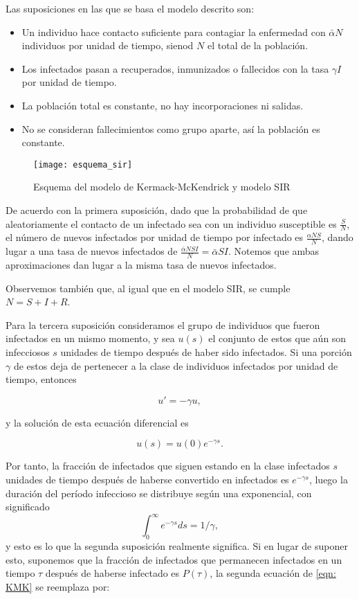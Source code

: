 Las suposiciones en las que se basa el modelo descrito son:

\begin{itemize}
\item Un individuo hace contacto suficiente para contagiar la enfermedad con $\bar{\alpha} N$ individuos por unidad de tiempo, sienod $N$ el total de la población.
\item Los infectados pasan a recuperados, inmunizados o fallecidos con la tasa $\gamma I$ por unidad de tiempo.
\item La población total es constante, no hay incorporaciones ni salidas.
\item No se consideran fallecimientos como grupo aparte, así la población es constante.
\end{itemize}

\begin{figure}
\begin{center}
\caption{Esquema del modelo de Kermack-McKendrick y modelo SIR}
\texttt{[image: esquema\_sir]}
\end{center}
\end{figure}

De acuerdo con la primera suposición, dado que la probabilidad de que aleatoriamente el contacto de un infectado sea con un individuo susceptible es $\frac{S}{N}$, el número de nuevos infectados por unidad de tiempo por infectado es $\frac{\alpha NS}{N}$, dando lugar a una tasa de nuevos infectados de $\frac{\bar{\alpha}  N S I}{N}=\bar{\alpha} SI$. Notemos que ambas aproximaciones dan lugar a la misma tasa de nuevos infectados.

Observemos también que, al igual que en el modelo SIR, se cumple $N=S+I+R$.

Para la tercera suposición consideramos el grupo de individuos que fueron infectados en un mismo momento, y sea $u(s)$ el conjunto de estos que aún son infecciosos $s$ unidades de tiempo después de haber sido infectados. Si una porción $\gamma$ de estos deja de pertenecer a la clase de individuos infectados por unidad de tiempo, entonces

$$u'=-\gamma u,$$

y la solución de esta ecuación diferencial es

$$u(s)=u(0)e^{-\gamma s}.$$

Por tanto, la fracción de infectados que siguen estando en la clase infectados $s$ unidades de tiempo después de haberse convertido en infectados es $e^{-\gamma s}$, luego la duración del período infeccioso se distribuye según una exponencial, con significado
$$\int_0^\infty e^{-\gamma s}ds=1/\gamma,$$
y esto es lo que la segunda suposición realmente significa. Si en lugar de suponer esto, suponemos que la fracción de infectados que permanecen infectados en un tiempo $\tau$ después de haberse infectado es $P(\tau )$, la segunda ecuación de \eqref{eqn: KMK} se reemplaza por:

